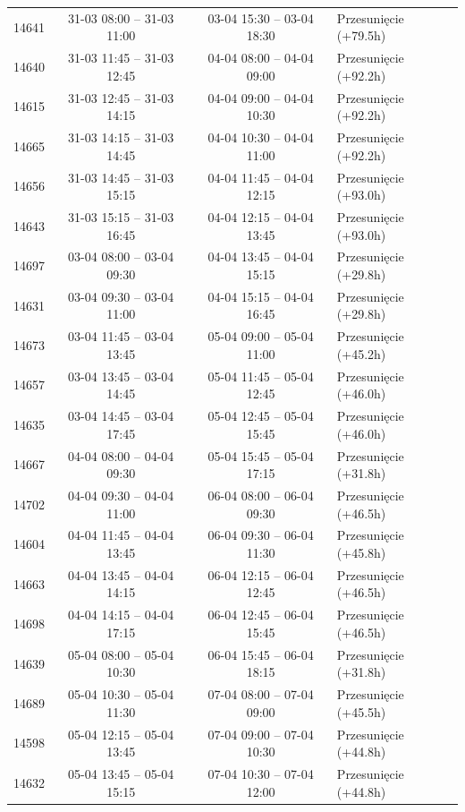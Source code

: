 \begin{table}[htbp]
\begin{tabular}{|r|c|c|l|}
14641 & 31-03 08:00 -- 31-03 11:00 & 03-04 15:30 -- 03-04 18:30 & Przesunięcie (+79.5h) \\ 
14640 & 31-03 11:45 -- 31-03 12:45 & 04-04 08:00 -- 04-04 09:00 & Przesunięcie (+92.2h) \\ 
14615 & 31-03 12:45 -- 31-03 14:15 & 04-04 09:00 -- 04-04 10:30 & Przesunięcie (+92.2h) \\ 
14665 & 31-03 14:15 -- 31-03 14:45 & 04-04 10:30 -- 04-04 11:00 & Przesunięcie (+92.2h) \\ 
14656 & 31-03 14:45 -- 31-03 15:15 & 04-04 11:45 -- 04-04 12:15 & Przesunięcie (+93.0h) \\ 
14643 & 31-03 15:15 -- 31-03 16:45 & 04-04 12:15 -- 04-04 13:45 & Przesunięcie (+93.0h) \\ 
14697 & 03-04 08:00 -- 03-04 09:30 & 04-04 13:45 -- 04-04 15:15 & Przesunięcie (+29.8h) \\ 
14631 & 03-04 09:30 -- 03-04 11:00 & 04-04 15:15 -- 04-04 16:45 & Przesunięcie (+29.8h) \\ 
14673 & 03-04 11:45 -- 03-04 13:45 & 05-04 09:00 -- 05-04 11:00 & Przesunięcie (+45.2h) \\ 
14657 & 03-04 13:45 -- 03-04 14:45 & 05-04 11:45 -- 05-04 12:45 & Przesunięcie (+46.0h) \\ 
14635 & 03-04 14:45 -- 03-04 17:45 & 05-04 12:45 -- 05-04 15:45 & Przesunięcie (+46.0h) \\ 
14667 & 04-04 08:00 -- 04-04 09:30 & 05-04 15:45 -- 05-04 17:15 & Przesunięcie (+31.8h) \\ 
14702 & 04-04 09:30 -- 04-04 11:00 & 06-04 08:00 -- 06-04 09:30 & Przesunięcie (+46.5h) \\ 
14604 & 04-04 11:45 -- 04-04 13:45 & 06-04 09:30 -- 06-04 11:30 & Przesunięcie (+45.8h) \\ 
14663 & 04-04 13:45 -- 04-04 14:15 & 06-04 12:15 -- 06-04 12:45 & Przesunięcie (+46.5h) \\ 
14698 & 04-04 14:15 -- 04-04 17:15 & 06-04 12:45 -- 06-04 15:45 & Przesunięcie (+46.5h) \\ 
14639 & 05-04 08:00 -- 05-04 10:30 & 06-04 15:45 -- 06-04 18:15 & Przesunięcie (+31.8h) \\ 
14689 & 05-04 10:30 -- 05-04 11:30 & 07-04 08:00 -- 07-04 09:00 & Przesunięcie (+45.5h) \\ 
14598 & 05-04 12:15 -- 05-04 13:45 & 07-04 09:00 -- 07-04 10:30 & Przesunięcie (+44.8h) \\ 
14632 & 05-04 13:45 -- 05-04 15:15 & 07-04 10:30 -- 07-04 12:00 & Przesunięcie (+44.8h) \\ 

\end{tabular}
\end{table}
